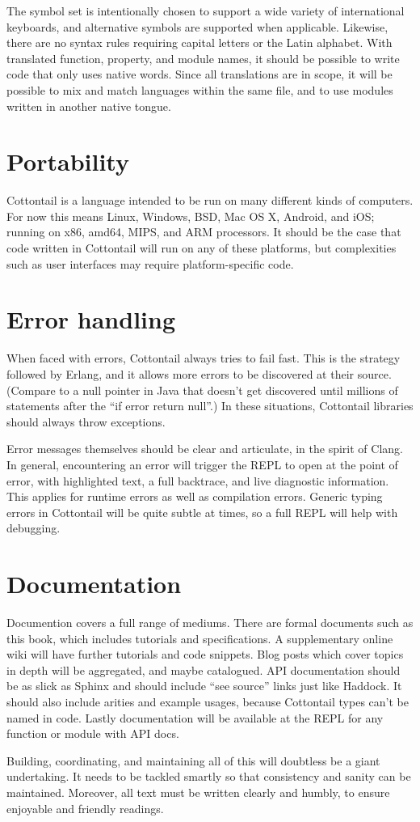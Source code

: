 The symbol set is intentionally chosen to support a wide variety of
international keyboards, and alternative symbols are supported when
applicable. Likewise, there are no syntax rules requiring capital
letters or the Latin alphabet. With translated function, property, and
module names, it should be possible to write code that only uses
native words. Since all translations are in scope, it will be possible
to mix and match languages within the same file, and to use modules
written in another native tongue.


\section{Portability}

Cottontail is a language intended to be run on many different kinds of
computers. For now this means Linux, Windows, BSD, Mac OS X, Android,
and iOS; running on x86, amd64, MIPS, and ARM processors. It should be
the case that code written in Cottontail will run on any of these
platforms, but complexities such as user interfaces may require
platform-specific code.


\section{Error handling}

When faced with errors, Cottontail always tries to fail fast. This is
the strategy followed by Erlang, and it allows more errors to be
discovered at their source. (Compare to a null pointer in Java that
doesn't get discovered until millions of statements after the ``if
error return null''.) In these situations, Cottontail libraries should
always throw exceptions.

Error messages themselves should be clear and articulate, in the
spirit of Clang. In general, encountering an error will trigger the
REPL to open at the point of error, with highlighted text, a full
backtrace, and live diagnostic information. This applies for runtime
errors as well as compilation errors. Generic typing errors in
Cottontail will be quite subtle at times, so a full REPL will help
with debugging.


\section{Documentation}

Documention covers a full range of mediums. There are formal documents
such as this book, which includes tutorials and specifications. A
supplementary online wiki will have further tutorials and code
snippets. Blog posts which cover topics in depth will be aggregated,
and maybe catalogued. API documentation should be as slick as Sphinx
and should include ``see source'' links just like Haddock. It should
also include arities and example usages, because Cottontail types
can't be named in code. Lastly documentation will be available at
the REPL for any function or module with API docs.

Building, coordinating, and maintaining all of this will doubtless be
a giant undertaking. It needs to be tackled smartly so that
consistency and sanity can be maintained. Moreover, all text must be
written clearly and humbly, to ensure enjoyable and friendly readings.
